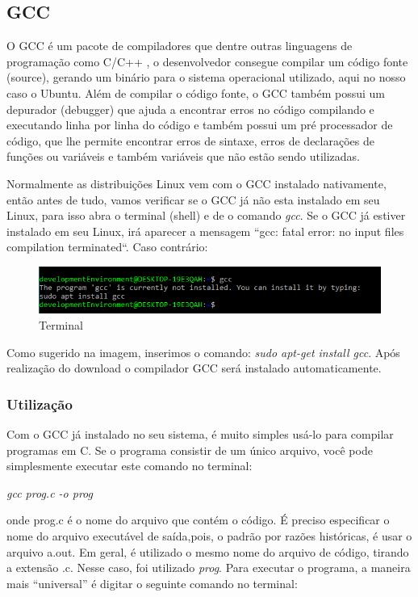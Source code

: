 \documentclass[12pt]{article}
\begin{document}
\subsection{GCC}

O GCC é um pacote de compiladores que dentre outras linguagens de programação como C/C++ \cite{gatliff1999embedding}, o desenvolvedor consegue compilar um código fonte (source), gerando um binário para o sistema operacional utilizado, aqui no nosso caso o Ubuntu. Além de compilar o código fonte, o GCC também possui um depurador (debugger) que ajuda a encontrar erros no código compilando e executando linha por linha do código e também possui um pré processador de código, que lhe permite encontrar erros de sintaxe, erros de declarações de funções ou variáveis e também variáveis que não estão sendo utilizadas.

Normalmente as distribuições Linux vem com o GCC instalado nativamente, então antes de tudo, vamos verificar se o GCC já não esta instalado em seu Linux, para isso abra o terminal (shell) e de o comando \textit{gcc}. Se o GCC já estiver instalado em seu Linux, irá aparecer a mensagem “gcc: fatal error: no input files compilation terminated“. Caso contrário:

\begin{figure}[ht]
\centering
\includegraphics[width=.75\textwidth]{1.png}
\caption{Terminal}
\label{fig:exampleFig1}
\end{figure}

\pagebreak Como sugerido na imagem, inserimos o comando: \textit{sudo apt-get install gcc}. Após realização do download o compilador GCC será instalado automaticamente.

\subsubsection{Utilização}
Com o GCC já instalado no seu sistema, é muito simples usá-lo para compilar programas em C. Se o programa consistir de um único arquivo, você pode simplesmente executar este comando no terminal:

\textit{gcc prog.c -o prog}

onde prog.c é o nome do arquivo que contém o código. É preciso especificar o nome do arquivo executável de saída,pois, o padrão por razões históricas, é usar o arquivo a.out. Em geral, é utilizado o mesmo nome do arquivo de código, tirando a extensão .c. Nesse caso, foi utilizado \textit{prog}.
Para executar o programa, a maneira mais “universal” é digitar o seguinte comando no terminal:
\end{document}
